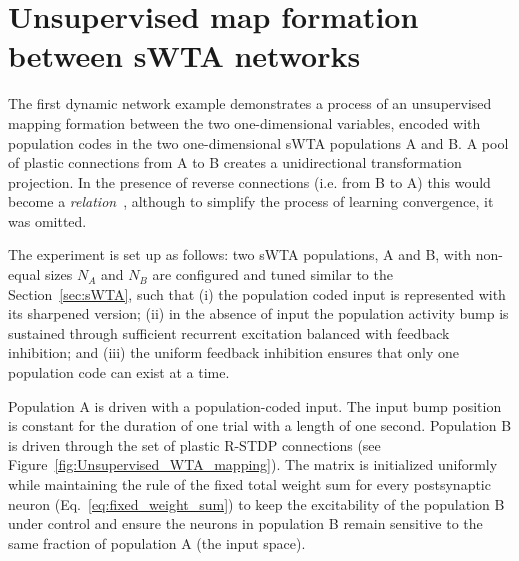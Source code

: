 \newpage
\section{Unsupervised map formation between sWTA networks}
\label{sec:unsupervised_WTA_map}

The first dynamic network example demonstrates a process of an unsupervised mapping formation between the two one-dimensional variables, encoded with population codes in the two one-dimensional \ac{sWTA} populations A and B. A pool of plastic connections from A to B creates a unidirectional transformation projection. In the presence of reverse connections (i.e. from B to A) this would become a \emph{relation}~\cite{Diehl_Cook16}, although to simplify the process of learning convergence, it was omitted.

The experiment is set up as follows: two \ac{sWTA} populations, A and B, with non-equal sizes $N_A$ and $N_B$ are configured and tuned similar to the Section~\ref{sec:sWTA}, such that (i) the population coded input is represented with its sharpened version; (ii) in the absence of input the population activity bump is sustained through sufficient recurrent excitation balanced with feedback inhibition; and (iii) the uniform feedback inhibition ensures that only one population code can exist at a time.

Population A is driven with a population-coded input. The input bump position is constant for the duration of one trial with a length of one second. Population B is driven through the set of plastic R-STDP connections (see Figure~\ref{fig:Unsupervised_WTA_mapping}). The matrix is initialized uniformly while maintaining the rule of the fixed total weight sum for every postsynaptic neuron (Eq.~\ref{eq:fixed_weight_sum}) to keep the excitability of the population B under control and ensure the neurons in population B remain sensitive to the same fraction of population A (the input space).

